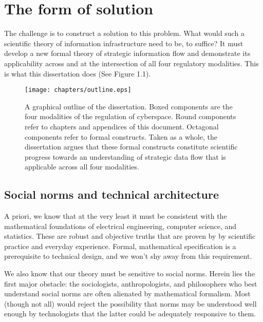 \documentclass[../thesis.tex]{subfiles}
\begin{document}
 \section{The form of solution}

 The challenge is to construct a solution to this problem.
 What would such a scientific theory of information
 infrastructure need to be, to suffice?
 It must develop a new formal theory of strategic information
 flow and demonstrate its applicability across and
 at the intersection of all four regulatory modalities.
 This is what this dissertation does (See Figure 1.1).
 
 \begin{figure}
  \begin{center}
  \texttt{[image: chapters/outline.eps]}
  \label{fig:outline}
  \end{center}
\caption[Graphical outline of this dissertation]{
  A graphical outline of the dissertation.
  Boxed components are the four modalities of
  the regulation of cyberspace.
  Round components refer to chapters and appendices
  of this document.
  Octagonal components refer to formal constructs.
  Taken as a whole, the dissertation argues that
  these formal constructs constitute scientific
  progress towards an understanding of strategic
  data flow that is applicable across all four
  modalities.
  }
\end{figure}
 
 \subsection{Social norms and technical architecture}

 A priori, we know that at the very least it must be
 consistent with the mathematical foundations of
 electrical engineering, computer science, and statistics.
 These are robust and objective truths that are proven
 by by scientific practice and everyday experience.
 Formal, mathematical specification is a prerequisite
 to technical design, and we won't shy away from this
 requirement.

 We also know that our theory must be sensitive to social
 norms.
 Herein lies the first major obstacle: the
 sociologists, anthropologists, and philosophers who best
 understand social norms are often alienated by
 mathematical formalism.
 Most (though not all) would reject the possibility that
 norms may be understood well enough by technologists
 that the latter could be adequately responsive to them.
\end{document}
